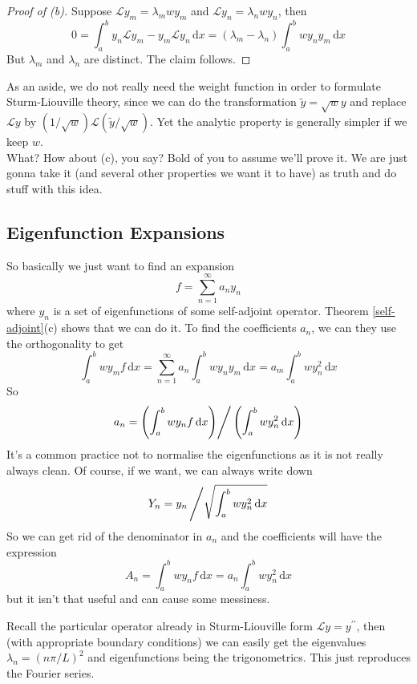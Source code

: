 \begin{proof}[Proof of (b)]
    Suppose $\mathcal Ly_m=\lambda_mwy_m$ and $\mathcal Ly_n=\lambda_nwy_n$, then
    $$0=\int_a^by_n\mathcal Ly_m-y_m\mathcal Ly_n\,\mathrm dx=(\lambda_m-\lambda_n)\int_a^bwy_ny_m\,\mathrm dx$$
    But $\lambda_m$ and $\lambda_n$ are distinct.
    The claim follows.
\end{proof}
As an aside, we do not really need the weight function in order to formulate Sturm-Liouville theory, since we can do the transformation $\tilde{y}=\sqrt{w}y$ and replace $\mathcal Ly$ by $(1/\sqrt{w})\mathcal L(\tilde{y}/\sqrt{w})$.
Yet the analytic property is generally simpler if we keep $w$.\\
What?
How about (c), you say?
Bold of you to assume we'll prove it.
We are just gonna take it (and several other properties we want it to have) as truth and do stuff with this idea.
\subsection{Eigenfunction Expansions}
So basically we just want to find an expansion
$$f=\sum_{n=1}^\infty a_ny_n$$
where $y_n$ is a set of eigenfunctions of some self-adjoint operator.
Theorem \ref{self-adjoint}(c) shows that we can do it.
To find the coefficients $a_n$, we can they use the orthogonality to get
$$\int_a^bwy_mf\,\mathrm dx=\sum_{n=1}^\infty a_n\int_a^bwy_ny_m\,\mathrm dx=a_m\int_a^bwy_n^2\,\mathrm dx$$
So
$$a_n=\left(\int_a^bwy_nf\,\mathrm dx\middle)\right/\left(\int_a^bwy_n^2\,\mathrm dx\right)$$
It's a common practice not to normalise the eigenfunctions as it is not really always clean.
Of course, if we want, we can always write down
$$Y_n=y_n\left/\sqrt{\int_a^bwy_n^2\,\mathrm dx}\right.$$
So we can get rid of the denominator in $a_n$ and the coefficients will have the expression
$$A_n=\int_a^bwy_nf\,\mathrm dx=a_n\int_a^bwy_n^2\,\mathrm dx$$
but it isn't that useful and can cause some messiness.
\begin{example}
    Recall the particular operator already in Sturm-Liouville form $\mathcal Ly=y^{\prime\prime}$, then (with appropriate boundary conditions) we can easily get the eigenvalues $\lambda_n=(n\pi/L)^2$ and eigenfunctions being the trigonometrics.
    This just reproduces the Fourier series.
\end{example}
